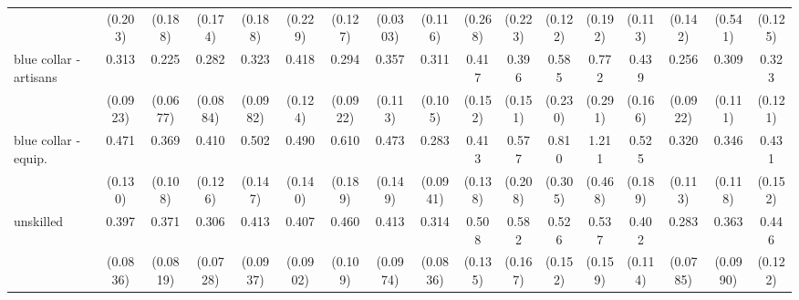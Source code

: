 {\begin{tabular}{l*{16}{c}}
                    &     (0.203)         &     (0.188)         &     (0.174)         &     (0.188)         &     (0.229)         &     (0.127)         &    (0.0303)         &     (0.116)         &     (0.268)         &     (0.223)         &     (0.122)         &     (0.192)         &     (0.113)         &     (0.142)         &     (0.541)         &     (0.125)         \\
[1em]
blue collar - artisans&       0.313\sym{***}&       0.225\sym{***}&       0.282\sym{***}&       0.323\sym{***}&       0.418\sym{**} &       0.294\sym{***}&       0.357\sym{**} &       0.311\sym{***}&       0.417\sym{*}  &       0.396\sym{*}  &       0.585         &       0.772         &       0.439\sym{*}  &       0.256\sym{***}&       0.309\sym{**} &       0.323\sym{**} \\
                    &    (0.0923)         &    (0.0677)         &    (0.0884)         &    (0.0982)         &     (0.124)         &    (0.0922)         &     (0.113)         &     (0.105)         &     (0.152)         &     (0.151)         &     (0.230)         &     (0.291)         &     (0.166)         &    (0.0922)         &     (0.111)         &     (0.121)         \\
[1em]
blue collar - equip.&       0.471\sym{**} &       0.369\sym{***}&       0.410\sym{**} &       0.502\sym{*}  &       0.490\sym{*}  &       0.610         &       0.473\sym{*}  &       0.283\sym{***}&       0.413\sym{**} &       0.577         &       0.810         &       1.211         &       0.525         &       0.320\sym{**} &       0.346\sym{**} &       0.431\sym{*}  \\
                    &     (0.130)         &     (0.108)         &     (0.126)         &     (0.147)         &     (0.140)         &     (0.189)         &     (0.149)         &    (0.0941)         &     (0.138)         &     (0.208)         &     (0.305)         &     (0.468)         &     (0.189)         &     (0.113)         &     (0.118)         &     (0.152)         \\
[1em]
unskilled           &       0.397\sym{***}&       0.371\sym{***}&       0.306\sym{***}&       0.413\sym{***}&       0.407\sym{***}&       0.460\sym{**} &       0.413\sym{***}&       0.314\sym{***}&       0.508\sym{*}  &       0.582         &       0.526\sym{*}  &       0.537\sym{*}  &       0.402\sym{**} &       0.283\sym{***}&       0.363\sym{***}&       0.446\sym{**} \\
                    &    (0.0836)         &    (0.0819)         &    (0.0728)         &    (0.0937)         &    (0.0902)         &     (0.109)         &    (0.0974)         &    (0.0836)         &     (0.135)         &     (0.167)         &     (0.152)         &     (0.159)         &     (0.114)         &    (0.0785)         &    (0.0990)         &     (0.122)         \\

\end{tabular}}
